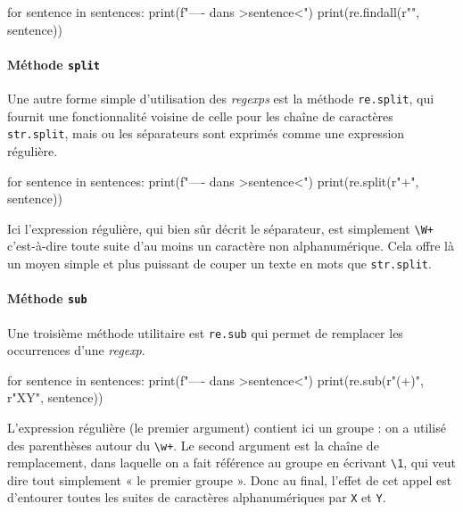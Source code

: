 \begin{idleconsole}
	\begin{pyconsole}
for sentence in sentences:
	print(f"---- dans >{sentence}<")
	print(re.findall(r"\w*[am]", sentence))

	\end{pyconsole}
\end{idleconsole}

\vspace{0.2\baselineskip}

\paragraph{Méthode {\normalfont\texttt{split}}}
Une autre forme simple d'utilisation des \textit{regexps} est la méthode \texttt{re.split}, qui fournit une fonctionnalité voisine de celle pour les chaîne de caractères \texttt{str.split}, mais ou les séparateurs sont exprimés comme une expression régulière.

\begin{idleconsole}
	\begin{pyconsole}
for sentence in sentences:
	print(f"---- dans >{sentence}<")
	print(re.split(r"\W+", sentence))

	\end{pyconsole}
\end{idleconsole}

Ici l'expression régulière, qui bien sûr décrit le séparateur, est simplement \lstinline[basicstyle={\small\shellttfont}]{\W+} c'est-à-dire toute suite d'au moins un caractère non alphanumérique. Cela offre là un moyen simple et plus puissant de couper un texte en mots que \texttt{str.split}.

\paragraph{Méthode {\normalfont\texttt{sub}}}
Une troisième méthode utilitaire est \texttt{re.sub} qui permet de remplacer les occurrences d'une \textit{regexp}.

\begin{idleconsole}
	\begin{pyconsole}
for sentence in sentences:
	print(f"---- dans >{sentence}<")
	print(re.sub(r"(\w+)", r"X\1Y", sentence))

	\end{pyconsole}
\end{idleconsole}

L'expression régulière (le premier argument) contient ici un groupe : on a utilisé des parenthèses autour du \lstinline[basicstyle={\small\shellttfont}]{\w+}. Le second argument est la chaîne de remplacement, dans laquelle on a fait référence au groupe en écrivant \lstinline[basicstyle={\small\shellttfont}]{\1}, qui veut dire tout simplement « le premier groupe ».
Donc au final, l'effet de cet appel est d'entourer toutes les suites de caractères alphanumériques par \lstinline[basicstyle={\small\shellttfont}]{X} et \lstinline[basicstyle={\small\shellttfont}]{Y}.

